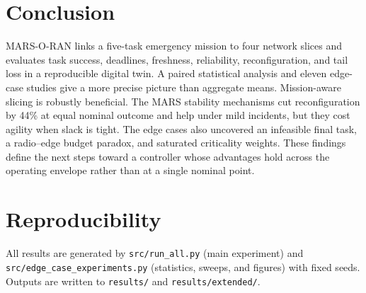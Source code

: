 \documentclass[conference]{IEEEtran}
\begin{document}
\section{Conclusion}
MARS-O-RAN links a five-task emergency mission to four network slices and evaluates task success, deadlines, freshness, reliability, reconfiguration, and tail loss in a reproducible digital twin. A paired statistical analysis and eleven edge-case studies give a more precise picture than aggregate means. Mission-aware slicing is robustly beneficial. The MARS stability mechanisms cut reconfiguration by 44\% at equal nominal outcome and help under mild incidents, but they cost agility when slack is tight. The edge cases also uncovered an infeasible final task, a radio--edge budget paradox, and saturated criticality weights. These findings define the next steps toward a controller whose advantages hold across the operating envelope rather than at a single nominal point.

\section*{Reproducibility}
All results are generated by \texttt{src/run\_all.py} (main experiment) and \texttt{src/edge\_case\_experiments.py} (statistics, sweeps, and figures) with fixed seeds. Outputs are written to \texttt{results/} and \texttt{results/extended/}.
\end{document}
